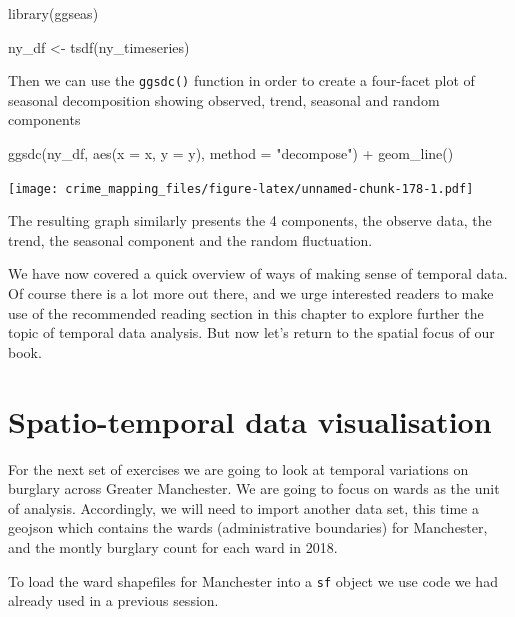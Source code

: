 \documentclass[
  krantz2]{krantz}
\makeatletter
\newenvironment{Shaded}{\begin{snugshade}}{\end{snugshade}}
\newcommand{\AttributeTok}[1]{\textcolor[rgb]{0.61,0.61,0.61}{#1}}
\newcommand{\FunctionTok}[1]{\textcolor[rgb]{0,0,0}{#1}}
\newcommand{\NormalTok}[1]{#1}
\newcommand{\OtherTok}[1]{\textcolor[rgb]{0.37,0.37,0.37}{#1}}
\newcommand{\SpecialCharTok}[1]{\textcolor[rgb]{0,0,0}{#1}}
\newcommand{\StringTok}[1]{\textcolor[rgb]{0.5,0.5,0.5}{#1}}
\newenvironment{kframe}{%
\medskip{}
\setlength{\fboxsep}{.8em}
 \def\at@end@of@kframe{}%
 \ifinner\ifhmode%
  \def\at@end@of@kframe{\end{minipage}}%
  \begin{minipage}{\columnwidth}%
 \fi\fi%
 \def\FrameCommand##1{\hskip\@totalleftmargin \hskip-\fboxsep
 \colorbox{shadecolor}{##1}\hskip-\fboxsep
     \hskip-\linewidth \hskip-\@totalleftmargin \hskip\columnwidth}%
 \MakeFramed {\advance\hsize-\width
   \@totalleftmargin\z@ \linewidth\hsize
   \@setminipage}}%
 {\par\unskip\endMakeFramed%
 \at@end@of@kframe}
\renewenvironment{Shaded}{\begin{kframe}}{\end{kframe}}
\makeatother
\begin{document}
\begin{Shaded}
\begin{Highlighting}[]
\FunctionTok{library}\NormalTok{(ggseas)}

\NormalTok{ny\_df }\OtherTok{\textless{}{-}} \FunctionTok{tsdf}\NormalTok{(ny\_timeseries)}
\end{Highlighting}
\end{Shaded}

Then we can use the \texttt{ggsdc()} function in order to create a four-facet plot of seasonal decomposition showing observed, trend, seasonal and random components

\begin{Shaded}
\begin{Highlighting}[]
\FunctionTok{ggsdc}\NormalTok{(ny\_df, }\FunctionTok{aes}\NormalTok{(}\AttributeTok{x =}\NormalTok{ x, }\AttributeTok{y =}\NormalTok{ y), }
      \AttributeTok{method =} \StringTok{"decompose"}\NormalTok{) }\SpecialCharTok{+}
   \FunctionTok{geom\_line}\NormalTok{()}
\end{Highlighting}
\end{Shaded}

\texttt{[image: crime\_mapping\_files/figure-latex/unnamed-chunk-178-1.pdf]}

The resulting graph similarly presents the 4 components, the observe data, the trend, the seasonal component and the random fluctuation.

We have now covered a quick overview of ways of making sense of temporal data. Of course there is a lot more out there, and we urge interested readers to make use of the recommended reading section in this chapter to explore further the topic of temporal data analysis. But now let's return to the spatial focus of our book.

\hypertarget{spatio-temporal-data-visualisation}{%
\section{Spatio-temporal data visualisation}\label{spatio-temporal-data-visualisation}}

For the next set of exercises we are going to look at temporal variations on burglary across Greater Manchester. We are going to focus on wards as the unit of analysis. Accordingly, we will need to import another data set, this time a geojson which contains the wards (administrative boundaries) for Manchester, and the montly burglary count for each ward in 2018.

To load the ward shapefiles for Manchester into a \texttt{sf} object we use code we had already used in a previous session.
\end{document}
